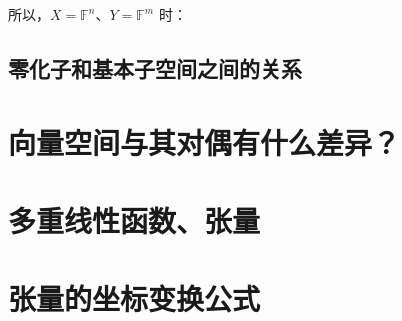 所以，$X=\mathbb{F}^n$、$Y=\mathbb{F}^m$ 时：
\begin{center}
\end{center}

\subsection{零化子和基本子空间之间的关系}

\section{向量空间与其对偶有什么差异？}

\section{多重线性函数、张量}

\section{张量的坐标变换公式}
